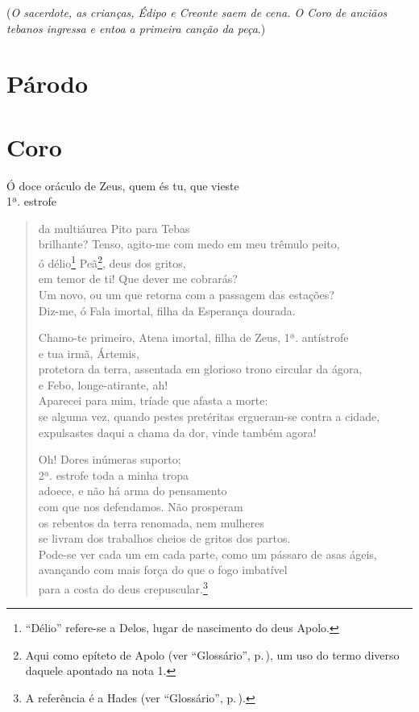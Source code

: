 (\emph{O sacerdote, as crianças, Édipo e Creonte saem de cena. O Coro de
anciãos tebanos ingressa e entoa a primeira canção da peça}.)


\section{Párodo}

\section{Coro}

\newcommand{\marca}[1]{{\hfill \small#1}}

Ó doce oráculo de Zeus, quem és tu, que vieste\\ \marca{1ª. estrofe}
\begin{verse}da multiáurea Pito para Tebas\\
brilhante? Tenso, agito-me com medo em meu trêmulo peito,\\
ó délio\footnote{``Délio'' refere-se a Delos, lugar de nascimento do
  deus Apolo.} Peã\footnote{Aqui como epíteto de Apolo (ver ``Glossário'', p.\,\pageref{glossario}),
um uso do termo diverso daquele apontado na nota 1.}, deus dos gritos,\\
em temor de ti! Que dever me cobrarás?\\
Um novo, ou um que retorna com a passagem das estações?\\
Diz-me, ó Fala imortal, filha da Esperança dourada.

Chamo-te primeiro, Atena imortal, filha de Zeus, 1ª. antístrofe\\
e tua irmã, Ártemis, \\
protetora da terra, assentada em glorioso trono circular da ágora,\\
e Febo, longe-atirante, ah!\\
Aparecei para mim, tríade que afasta a morte:\\
se alguma vez, quando pestes pretéritas ergueram-se contra a cidade,\\
expulsastes daqui a chama da dor, vinde também agora!

Oh! Dores inúmeras suporto;\\ 2ª. estrofe
toda a minha tropa\\
adoece, e não há arma do pensamento \\
com que nos defendamos. Não prosperam\\
os rebentos da terra renomada, nem mulheres\\
se livram dos trabalhos cheios de gritos dos partos.\\
Pode-se ver cada um em cada parte, como um pássaro de asas ágeis,\\
avançando com mais força do que o fogo imbatível\\
para a costa do deus crepuscular.\footnote{A referência é a Hades (ver ``Glossário'', p.\,\pageref{glossario}).}


\end{verse}
